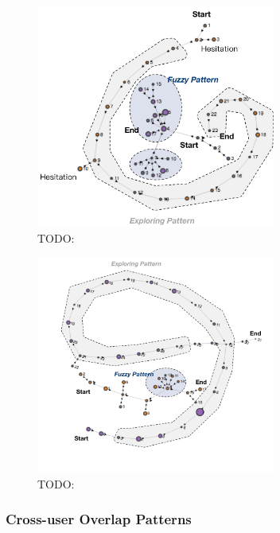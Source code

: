 \begin{figure}[H]
    \centering
    \includegraphics[width=0.7\textwidth]{figures/vis-fuzzy-explore1}
    \caption{TODO:}
    \label{fig:vis-fuzzy-explore1}
\end{figure}

\begin{figure}[H]
    \centering
    \includegraphics[width=0.7\textwidth]{figures/vis-fuzzy-explore2}
    \caption{TODO:}
    \label{fig:vis-fuzzy-explore1}
\end{figure}

\subsubsection{Cross-user Overlap Patterns}

